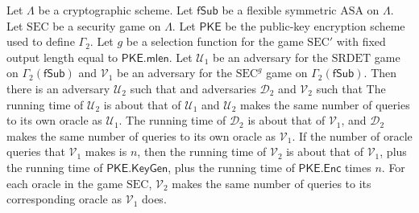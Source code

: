 \begin{theorem} \label{theorem:gen2}
Let $\mathsf{\Lambda}$ be a cryptographic scheme. Let $\mathsf{fSub}$ be a flexible symmetric $\mathrm{ASA}$ on $\mathsf{\Lambda}$. Let $\mathrm{SEC}$ be a security game on $\mathsf{\Lambda}$. Let $\mathsf{PKE}$ be the public-key encryption scheme used to define $\Gamma_2$. Let $g$ be a selection function for the game $\mathrm{SEC}'$ with fixed output length equal to $\mathsf{PKE.mlen}$. Let $\mathcal{U}_1$ be an adversary for the $\mathrm{SRDET}$ game on $\Gamma_2(\mathsf{fSub})$ and $\mathcal{V}_1$ be an adversary for the $\mathrm{SEC}^g$ game on $\Gamma_2(\mathsf{fSub})$. Then there is an adversary $\mathcal{U}_2$ such that
and adversaries $\mathcal{D}_2$ and $\mathcal{V}_2$ such that
The running time of $\mathcal{U}_2$ is about that of $\mathcal{U}_1$ and $\mathcal{U}_2$ makes the same number of queries to its own oracle as $\mathcal{U}_1$. The running time of $\mathcal{D}_2$ is about that of $\mathcal{V}_1$, and $\mathcal{D}_2$ makes the same number of queries to its own oracle as $\mathcal{V}_1$. If the number of oracle queries that $\mathcal{V}_1$ makes is $n$, then the running time of $\mathcal{V}_2$ is about that of $\mathcal{V}_1$, plus the running time of $\mathsf{PKE.KeyGen}$, plus the running time of $\mathsf{PKE.Enc}$ times $n$. For each oracle in the game $\mathrm{SEC}$, $\mathcal{V}_2$ makes the same number of queries to its corresponding oracle as $\mathcal{V}_1$ does.
\end{theorem}

